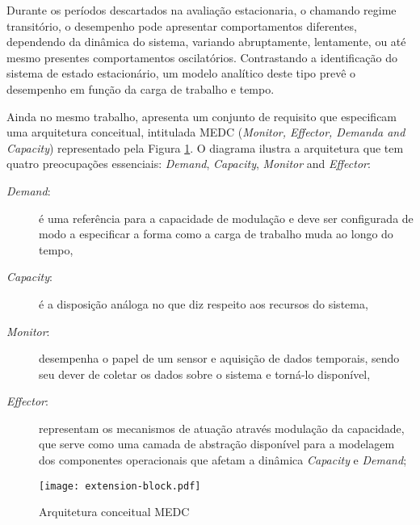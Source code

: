 Durante os períodos descartados na avaliação estacionaria, o chamando regime transitório, o desempenho pode apresentar comportamentos diferentes, dependendo da dinâmica do sistema, variando abruptamente, lentamente, ou até mesmo presentes comportamentos oscilatórios. Contrastando a identificação do sistema de estado estacionário, um modelo analítico deste tipo prevê o desempenho em função da carga de trabalho e tempo.

Ainda no mesmo trabalho,  apresenta um conjunto de requisito que especificam uma arquitetura conceitual, intitulada MEDC (\textit{Monitor, Effector, Demanda and Capacity}) representado pela Figura \ref{fig:extension-block}. O diagrama ilustra a arquitetura que tem quatro preocupações essenciais: \textit{Demand}, \textit{Capacity}, \textit{Monitor} and \textit{Effector}:

\begin{description}
	\item[\textit{Demand}:] é uma referência para a capacidade de modulação e deve ser configurada de modo a especificar a forma como a carga de trabalho muda ao longo do tempo,
	\item[\textit{Capacity}:]  é a disposição análoga no que diz respeito aos recursos do sistema,
	\item[\textit{Monitor}:] desempenha o papel de um sensor e aquisição de dados temporais, sendo seu dever de coletar os dados sobre o sistema e torná-lo disponível,
	\item[\textit{Effector}:] representam os mecanismos de atuação através modulação da capacidade, que serve como uma camada de abstração disponível para a modelagem dos componentes operacionais que afetam a dinâmica \textit{Capacity} e \textit{Demand};
\end{description}

\begin{figure}[!htb]
	\centering
	\texttt{[image: extension-block.pdf]}
	\caption{Arquitetura conceitual MEDC}
	\label{fig:extension-block}
\end{figure}

